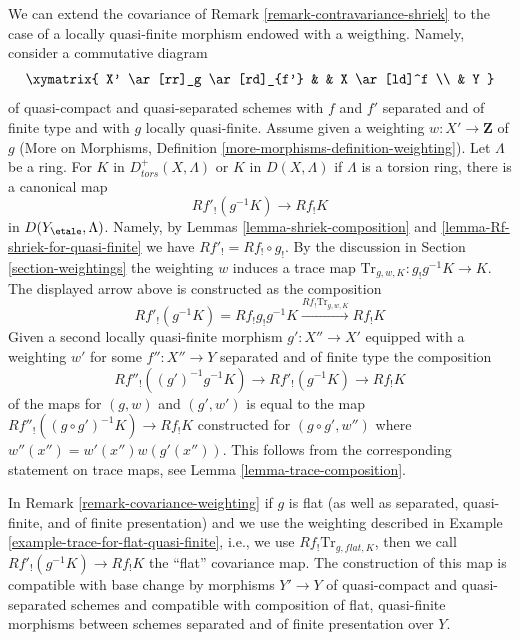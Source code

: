 \begin{remark}
\label{remark-covariance-weighting}
We can extend the covariance of Remark \ref{remark-contravariance-shriek}
to the case of a locally quasi-finite morphism endowed with a weigthing.
Namely, consider a commutative diagram
$$
\xymatrix{
X' \ar[rr]_g \ar[rd]_{f'} & & X \ar[ld]^f \\
& Y
}
$$
of quasi-compact and quasi-separated schemes with $f$ and $f'$
separated and of finite type and with $g$ locally quasi-finite.
Assume given a weighting $w : X' \to \mathbf{Z}$ of $g$
(More on Morphisms, Definition \ref{more-morphisms-definition-weighting}).
Let $\Lambda$ be a ring. For $K$ in $D^+_{tors}(X, \Lambda)$
or $K$ in $D(X, \Lambda)$ if $\Lambda$ is a torsion ring, there
is a canonical map
$$
Rf'_!(g^{-1}K) \longrightarrow Rf_!K
$$
in $D(Y_\etale, \Lambda)$. Namely, by Lemmas \ref{lemma-shriek-composition}
and \ref{lemma-Rf-shriek-for-quasi-finite} we have $Rf'_! = Rf_! \circ g_!$.
By the discussion in Section \ref{section-weightings} the weighting
$w$ induces a trace map $\text{Tr}_{g, w, K} : g_!g^{-1}K \to K$.
The displayed arrow above is constructed as the composition
$$
Rf'_!(g^{-1}K) = Rf_!g_!g^{-1}K
\xrightarrow{Rf_! \text{Tr}_{g, w, K}}
Rf_!K
$$
Given a second locally quasi-finite morphism $g' : X'' \to X'$
equipped with a weighting $w'$ for some $f'' : X'' \to Y$ separated
and of finite type the composition
$$
Rf''_!((g')^{-1}g^{-1}K) \longrightarrow Rf'_!(g^{-1}K) \longrightarrow Rf_!K
$$
of the maps for $(g, w)$ and $(g', w')$ is equal to the map
$Rf''_!((g \circ g')^{-1}K) \longrightarrow Rf_!K$
constructed for $(g \circ g', w'')$ where $w''(x'') = w'(x'')w(g'(x''))$.
This follows from the corresponding statement
on trace maps, see Lemma \ref{lemma-trace-composition}.
\end{remark}

\begin{remark}
\label{remark-flat-covariance}
In Remark \ref{remark-covariance-weighting} if $g$ is flat
(as well as separated, quasi-finite, and of finite presentation)
and we use the weighting described in
Example \ref{example-trace-for-flat-quasi-finite}, i.e., we use
$Rf_! \text{Tr}_{g, \mathit{flat}, K}$, then we call
$Rf'_!(g^{-1}K) \longrightarrow Rf_!K$ the ``flat'' covariance map.
The construction of this map is compatible with base change by
morphisms $Y' \to Y$ of quasi-compact and quasi-separated schemes
and compatible with composition of flat, quasi-finite
morphisms between schemes separated and of finite presentation over $Y$.
\end{remark}

